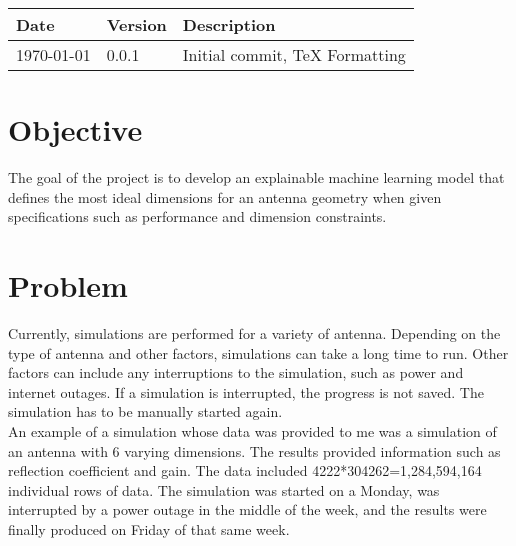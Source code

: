 \documentclass[12pt, letterpaper, notitlepage]{article}
\begin{document}
\newpage
\noindent\begin{tabularx}{\textwidth}{|X|X|X|} \hline
    \textbf{Date} & \textbf{Version} & \textbf{Description} \\ \hline \hline
    \today & 0.0.1 & Initial commit, TeX Formatting\\ \hline
\end{tabularx}


\section*{Objective}
The goal of the project is to develop an explainable machine learning model that defines the most ideal dimensions for an antenna geometry when given specifications such as performance and dimension constraints. 


\section*{Problem}
Currently, simulations are performed for a variety of antenna. Depending on the type of antenna and other factors, simulations can take a long time to run. Other factors can include any interruptions to the simulation, such as power and internet outages. If a simulation is interrupted, the progress is not saved. The simulation has to be manually started again.\\
An example of a simulation whose data was provided to me was a simulation of an antenna with 6 varying dimensions. The results provided information such as reflection coefficient and gain. The data included 4222*304262=1,284,594,164 individual rows of data. The simulation was started on a Monday, was interrupted by a power outage in the middle of the week, and the results were finally produced on Friday of that same week. \\
\end{document}
